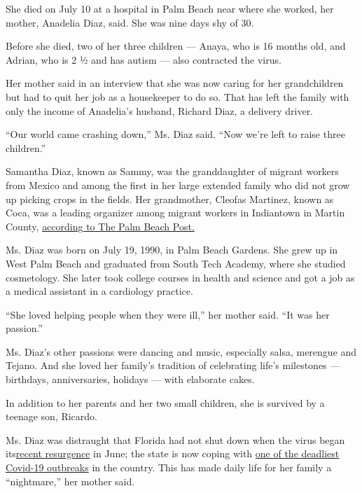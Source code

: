 She died on July 10 at a hospital in Palm Beach near where she worked,
her mother, Anadelia Diaz, said. She was nine days shy of 30.

Before she died, two of her three children --- Anaya, who is 16 months
old, and Adrian, who is 2 ½ and has autism --- also contracted the
virus.

Her mother said in an interview that she was now caring for her
grandchildren but had to quit her job as a housekeeper to do so. That
has left the family with only the income of Anadelia's husband, Richard
Diaz, a delivery driver.

``Our world came crashing down,'' Ms. Diaz said. ``Now we're left to
raise three children.''

Samantha Diaz, known as Sammy, was the granddaughter of migrant workers
from Mexico and among the first in her large extended family who did not
grow up picking crops in the fields. Her grandmother, Cleofas Martinez,
known as Coca, was a leading organizer among migrant workers in
Indiantown in Martin County,
\href{https://www.palmbeachpost.com/news/20200716/lost-to-coronavirus-29-year-old-working-american-dream}{according
to The Palm Beach Post.}

Ms. Diaz was born on July 19, 1990, in Palm Beach Gardens. She grew up
in West Palm Beach and graduated from South Tech Academy, where she
studied cosmetology. She later took college courses in health and
science and got a job as a medical assistant in a cardiology practice.

``She loved helping people when they were ill,'' her mother said. ``It
was her passion.''

Ms. Diaz's other passions were dancing and music, especially salsa,
merengue and Tejano. And she loved her family's tradition of celebrating
life's milestones --- birthdays, anniversaries, holidays --- with
elaborate cakes.

In addition to her parents and her two small children, she is survived
by a teenage son, Ricardo.

Ms. Diaz was distraught that Florida had not shut down when the virus
began
its\href{https://wptv.com/news/state/state-cases-surge-by-record-3-207-state-death-toll-up-43-including-6-in-palm-beach-county?fbclid=IwAR0647Jk_oGURUO3-FXAbJbOeZmbtKLdH6Bgq4rFaaDxih3tWvo-Ff1K82M}{recent
resurgence} in June; the state is now coping with
\href{https://www.nytimes3xbfgragh.onion/interactive/2020/us/florida-coronavirus-cases.html}{one
of the deadliest Covid-19 outbreaks} in the country. This has made daily
life for her family a ``nightmare,'' her mother said.

